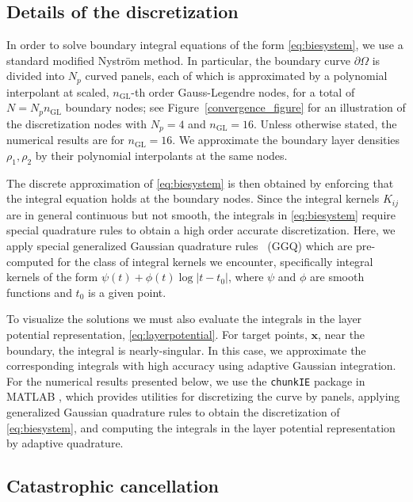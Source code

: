 \documentclass[preprint,12pt,3p]{elsarticle}
\begin{document}
\subsection{Details of the discretization}
\label{num_details}
In order to solve boundary integral equations  of the form \eqref{eq:biesystem}, we use a standard modified Nystr\"{o}m method. In particular,
the boundary curve $\partial \Omega$ is divided into $N_p$ curved panels, each of which
is approximated by a polynomial interpolant at scaled, $n_{\textrm{GL}}$-th order
Gauss-Legendre nodes, for a total of $N=N_p n_{\textrm{GL}}$ boundary
nodes; see Figure~\ref{convergence_figure} for an illustration of the 
discretization nodes with $N_p=4$ and $n_{\textrm{GL}}=16$. Unless otherwise stated,
the numerical results are for $n_{\textrm{GL}}=16$. We approximate the boundary layer
densities $\rho_1,\rho_2$ by their polynomial interpolants at the same nodes. 

The discrete approximation of \eqref{eq:biesystem} is then obtained by enforcing
that the integral equation holds at the boundary nodes. 
Since the integral kernels $K_{ij}$ are in general continuous but not smooth, the integrals in 
\eqref{eq:biesystem} require special quadrature rules to obtain a high order accurate
discretization. 
Here, we apply special generalized Gaussian quadrature rules~\cite{bremer2010nonlinear} (GGQ) which are 
pre-computed for the class of integral kernels we encounter, specifically integral 
kernels of the form $\psi(t) + \phi(t) \log |t-t_0|$, where $\psi$ and $\phi$ 
are smooth functions and $t_0$ is a given point. 

To visualize the solutions we must also evaluate the integrals in the layer 
potential representation, \eqref{eq:layerpotential}. For target points, $\mathbf{x}$,
near the boundary, the integral is nearly-singular. In this case, we approximate the corresponding 
integrals with high accuracy using adaptive Gaussian integration. For the numerical results presented below, we use the \texttt{chunkIE} package in MATLAB
\cite{Askham_chunkIE_a_MATLAB_2024}, which provides utilities for discretizing the curve 
by panels, applying generalized Gaussian quadrature rules to obtain the 
discretization of \eqref{eq:biesystem}, and computing the integrals
in the layer potential representation by adaptive quadrature. 

\subsection{Catastrophic cancellation}
\label{num_cancel}
\end{document}
